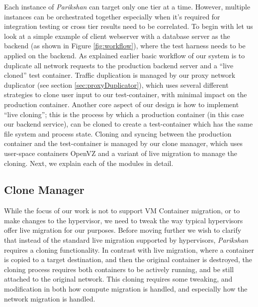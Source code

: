 Each instance of \textit{Parikshan} can target only one tier at a time.
However, multiple instances can be orchestrated together especially when it's required for integration testing or cross tier results need to be correlated.
To begin with let us look at a simple example of client webserver with a database server as the backend (as shown in Figure \ref{fig:workflow}), where the test harness needs to be applied on the backend.
As explained earlier basic workflow of our system is to duplicate all network requests to the production backend server and a ``live cloned'' test container.
Traffic duplication is managed by our proxy network duplicator (see section \ref{sec:proxyDuplicator}), which uses several different strategies to clone user input to our test-container, with minimal impact on the production container.
Another core aspect of our design is how to implement ``live cloning''; this is the process by which a production container (in this case our backend service), can be cloned to create a test-container which has the same file system and process state. 
Cloning and syncing between the production container and the test-container is managed by our clone manager, which uses user-space containers OpenVZ and a variant of live migration to manage the cloning.
Next, we explain each of the modules in detail.



\subsection{Clone Manager} 
\label{sec:CloneManager}


While the focus of our work is not to support VM Container migration, or to make changes to the hypervisor, we need to tweak the way typical hypervisors offer live migration for our purposes.
Before moving further we wish to clarify that instead of the standard live migration supported by hypervisors, \textit{Parikshan} requires a cloning functionality. 
In contrast with live migration, where a container is copied to a target destination, and then the original container is destroyed, the cloning process requires both containers to be actively running, and be still attached to the original network.
This cloning requires some tweaking, and modification in both how compute migration is handled, and especially how the network migration is handled. 

